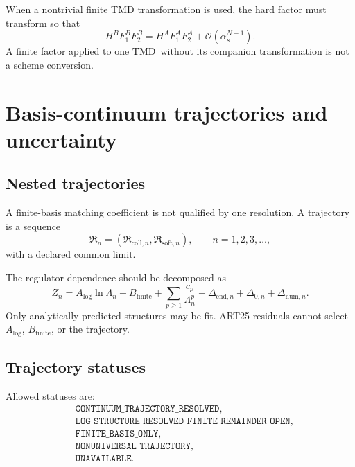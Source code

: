 \documentclass[11pt]{article}
\newcommand{\TMD}{\ensuremath{\mathrm{TMD}}}
\newcommand{\Coll}{\ensuremath{\mathrm{coll}}}
\newcommand{\Soft}{\ensuremath{\mathrm{soft}}}
\newcommand{\order}{\mathcal O}
\newcommand{\as}{\alpha_s}
\begin{document}
When a nontrivial finite TMD transformation is used, the hard factor must transform so that
\begin{equation}
 H^{B}
 F_1^{B}
 F_2^{B}
 =
 H^{A}
 F_1^{A}
 F_2^{A}
 +
 \order(\as^{N+1}).
 \label{eq:cross-section-invariance}
\end{equation}
A finite factor applied to one \TMD\ without its companion transformation is not a scheme conversion.

\section{Basis-continuum trajectories and uncertainty}
\label{sec:trajectory}

\subsection{Nested trajectories}

A finite-basis matching coefficient is not qualified by one resolution.  A trajectory is a sequence
\begin{equation}
 \mathfrak R_n
 =
 \left(
 \mathfrak R_{\Coll,n},
 \mathfrak R_{\Soft,n}
 \right),
 \qquad n=1,2,3,\ldots,
 \label{eq:reg-trajectory}
\end{equation}
with a declared common limit.

The regulator dependence should be decomposed as
\begin{equation}
 Z_n
 =
 A_{\log}\ln\Lambda_n
 +
 B_{\mathrm{finite}}
 +
 \sum_{p\ge1}
 \frac{c_p}{\Lambda_n^p}
 +
 \Delta_{\mathrm{end},n}
 +
 \Delta_{0,n}
 +
 \Delta_{\mathrm{num},n}.
 \label{eq:trajectory-decomposition}
\end{equation}
Only analytically predicted structures may be fit.  ART25 residuals cannot select \(A_{\log}\), \(B_{\mathrm{finite}}\), or the trajectory.

\subsection{Trajectory statuses}

Allowed statuses are:
\begin{align}
 &\texttt{CONTINUUM\_TRAJECTORY\_RESOLVED},\\
 &\texttt{LOG\_STRUCTURE\_RESOLVED\_FINITE\_REMAINDER\_OPEN},\\
 &\texttt{FINITE\_BASIS\_ONLY},\\
 &\texttt{NONUNIVERSAL\_TRAJECTORY},\\
 &\texttt{UNAVAILABLE}.
 \label{eq:trajectory-statuses}
\end{align}
\end{document}
